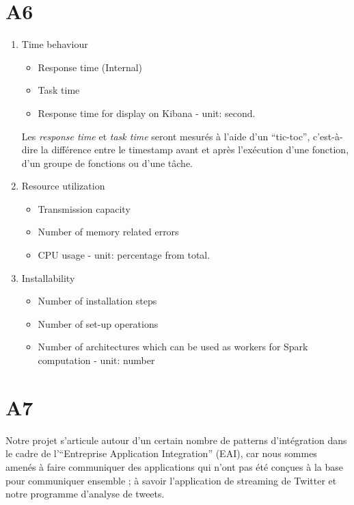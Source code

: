 \section{A6}
  \begin{enumerate}
    \item Time behaviour
      \begin{itemize}
        \item Response time (Internal)
        \item Task time
        \item Response time for display on Kibana - unit: second.
      \end{itemize} \bigskip

      Les \emph{response time} et \emph{task time} seront mesurés à l'aide d'un ``tic-toc'', c'est-à-dire la différence entre le timestamp avant et après l'exécution d'une fonction, d'un groupe de fonctions ou d'une tâche. \\

    \item Resource utilization
      \begin{itemize}
        \item Transmission capacity
        \item Number of memory related errors
        \item CPU usage - unit: percentage from total.
      \end{itemize} \bigskip

    \item Installability
      \begin{itemize}
        \item Number of installation steps
        \item Number of set-up operations
        \item Number of architectures which can be used as workers for Spark computation - unit: number
      \end{itemize} \bigskip
  \end{enumerate}

\section{A7}
  Notre projet s'articule autour d'un certain nombre de patterns d'intégration dans le cadre de l'``Entreprise Application Integration'' (EAI), car nous sommes amenés à faire communiquer des applications qui n'ont pas été conçues à la base pour communiquer ensemble ; à savoir l'application de streaming de Twitter et notre programme d'analyse de tweets. \\

